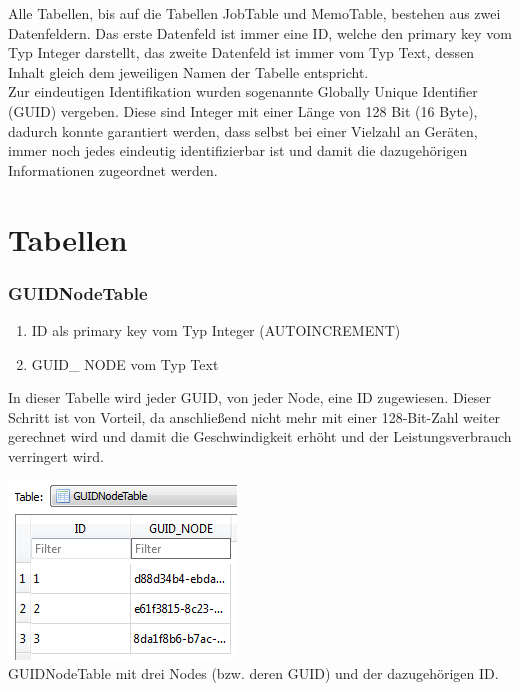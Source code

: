 \documentclass[12pt,a4paper]{report}
\begin{document}
\begin{onehalfspace}
Alle Tabellen, bis auf die Tabellen JobTable und MemoTable, bestehen aus zwei Datenfeldern. Das erste Datenfeld ist immer eine ID, welche den primary key vom Typ Integer darstellt, das zweite Datenfeld ist immer vom Typ Text, dessen Inhalt gleich dem jeweiligen Namen der Tabelle entspricht.\\

Zur eindeutigen Identifikation wurden sogenannte Globally Unique Identifier (GUID) vergeben. Diese sind Integer mit einer Länge von 128 Bit (16 Byte), dadurch konnte garantiert werden, dass selbst bei einer Vielzahl an Geräten, immer noch jedes eindeutig identifizierbar ist und damit die dazugehörigen Informationen zugeordnet werden.
\section{Tabellen}
\subsubsection{GUIDNodeTable}
\begin{enumerate}
\item ID als primary key vom Typ Integer (AUTOINCREMENT)
\item GUID\_ NODE vom Typ Text
\end{enumerate}
In dieser Tabelle wird jeder GUID, von jeder Node, eine ID zugewiesen. Dieser Schritt ist von Vorteil, da anschließend nicht mehr mit einer 128-Bit-Zahl weiter gerechnet wird und damit die Geschwindigkeit erhöht und der Leistungsverbrauch verringert wird.
\begin{center}
\includegraphics[scale=0.8]{img/db-tb-guid-node.png}\\
GUIDNodeTable mit drei Nodes (bzw. deren GUID) und der dazugehörigen ID.
\end{center}

\end{onehalfspace}
\end{document}
